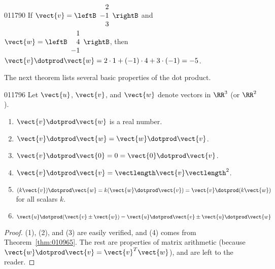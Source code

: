 \begin{example}{}{011790}
If 
$\vect{v} = \leftB
\begin{array}{r}
2 \\
-1 \\
3 
\end{array} \rightB$
 and
$\vect{w} = \leftB
\begin{array}{r}
1 \\
4\\
-1 
\end{array} \rightB$, then $\vect{v} \dotprod \vect{w} = 2 \cdot 1 + (-1) \cdot 4 + 3 \cdot (-1) = -5$.
\end{example}

The next theorem lists several basic properties of the dot product.


\begin{theorem}{}{011796}
Let $\vect{u}$, $\vect{v}$, and $\vect{w}$ denote vectors in $\RR^3$ (or $\RR^2$).


\begin{enumerate}
\item $\vect{v} \dotprod \vect{w}$ is a real number.

\item  $\vect{v} \dotprod \vect{w} = \vect{w} \dotprod \vect{v}$.

\item  $\vect{v} \dotprod \vect{0} = 0 = \vect{0} \dotprod \vect{v}$.

\item  $\vect{v} \dotprod \vect{v} = \vectlength\vect{v}\vectlength^{2}$.

\item $(k\vect{v}) \dotprod \vect{w} = k(\vect{w} \dotprod \vect{v}) = \vect{v} \dotprod (k\vect{w})$ for all scalars $k$.

\item $\vect{u} \dotprod (\vect{v} \pm \vect{w}) = \vect{u} \dotprod \vect{v} \pm \vect{u} \dotprod \vect{w}$

\end{enumerate}
\end{theorem}

\begin{proof}
(1), (2), and (3) are easily verified, and (4) comes from Theorem~\ref{thm:010965}. The rest are properties of matrix arithmetic (because $\vect{w} \dotprod \vect{v} = \vect{v}^{T}\vect{w}$), and are left to the reader.
\end{proof}


